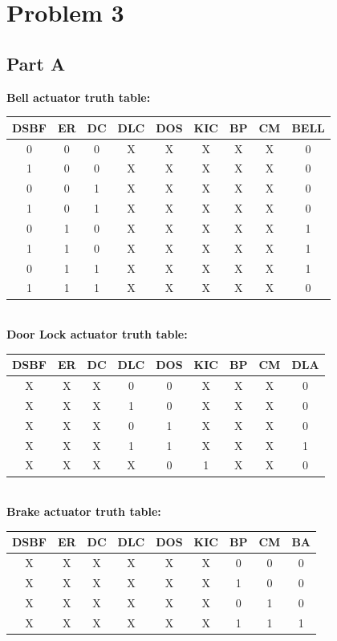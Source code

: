\documentclass{article}
\begin{document}
\section{Problem 3}

\subsection{Part A}
\textbf{Bell actuator truth table:}
\\
\begin{tabular} {c c c c c c c c | c}
    \hline
    DSBF & ER & DC & DLC & DOS & KIC & BP & CM & BELL \\
    \hline
    0 & 0 & 0 & X & X & X & X & X & 0 \\
    1 & 0 & 0 & X & X & X & X & X & 0 \\
    0 & 0 & 1 & X & X & X & X & X & 0 \\
    1 & 0 & 1 & X & X & X & X & X & 0 \\
    0 & 1 & 0 & X & X & X & X & X & 1 \\
    1 & 1 & 0 & X & X & X & X & X & 1 \\
    0 & 1 & 1 & X & X & X & X & X & 1 \\
    1 & 1 & 1 & X & X & X & X & X & 0 \\
\end{tabular}
\\

\noindent\textbf{Door Lock actuator truth table:}
\\
\begin{tabular} {c c c c c c c c | c}
    \hline
    DSBF & ER & DC & DLC & DOS & KIC & BP & CM & DLA \\
    \hline
    X & X & X & 0 & 0 & X & X & X & 0 \\
    X & X & X & 1 & 0 & X & X & X & 0 \\
    X & X & X & 0 & 1 & X & X & X & 0 \\
    X & X & X & 1 & 1 & X & X & X & 1 \\
    X & X & X & X & 0 & 1 & X & X & 0 \\
\end{tabular}
\\

\noindent\textbf{Brake actuator truth table:}
\\
\begin{tabular} {c c c c c c c c | c}
    \hline
    DSBF & ER & DC & DLC & DOS & KIC & BP & CM & BA \\
    \hline
    X & X & X & X & X & X & 0 & 0 & 0 \\
    X & X & X & X & X & X & 1 & 0 & 0 \\
    X & X & X & X & X & X & 0 & 1 & 0 \\
    X & X & X & X & X & X & 1 & 1 & 1 \\
\end{tabular}
\\
\end{document}
